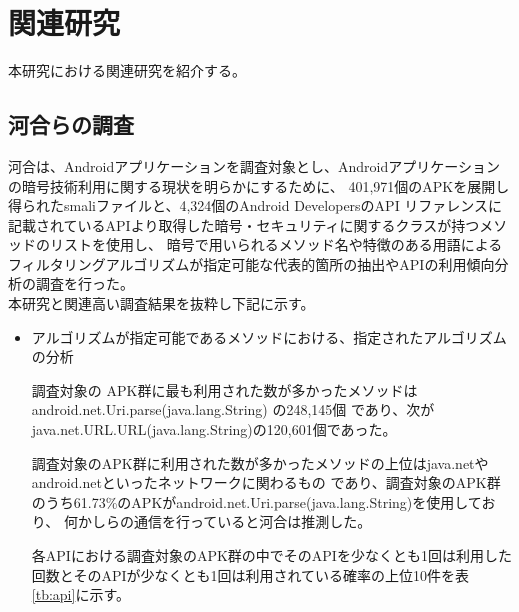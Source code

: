 \newpage
\section{関連研究} %
本研究における関連研究を紹介する。

\subsection{河合らの調査}
河合は、Androidアプリケーションを調査対象とし、Androidアプリケーションの暗号技術利用に関する現状を明らかにするために、
401,971個のAPKを展開し得られたsmaliファイルと、4,324個のAndroid DevelopersのAPI リファレンスに記載されているAPIより取得した暗号・セキュリティに関するクラスが持つメソッドのリストを使用し、
暗号で用いられるメソッド名や特徴のある用語によるフィルタリングアルゴリズムが指定可能な代表的箇所の抽出やAPIの利用傾向分析の調査を行った。
\\本研究と関連高い調査結果を抜粋し下記に示す。



\begin{itemize}
\item アルゴリズムが指定可能であるメソッドにおける、指定されたアルゴリズムの分析


調査対象の APK群に最も利用された数が多かったメソッドは
android.net.Uri.parse(java.lang.String) の248,145個
であり、次がjava.net.URL.URL(java.lang.String)の120,601個であった。

調査対象のAPK群に利用された数が多かったメソッドの上位はjava.netやandroid.netといったネットワークに関わるもの
であり、調査対象のAPK群のうち61.73\%のAPKがandroid.net.Uri.parse(java.lang.String)を使用しており、
何かしらの通信を行っていると河合は推測した。

各APIにおける調査対象のAPK群の中でそのAPIを少なくとも1回は利用した回数とそのAPIが少なくとも1回は利用されている確率の上位10件を表\ref{tb:api}に示す。
\end{itemize}


